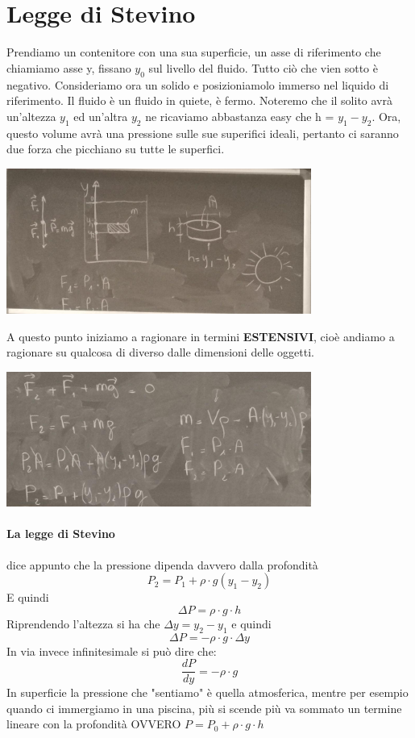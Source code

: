 \documentclass[12pt, a4paper, openany, oneside]{book}
\begin{document}
\section{Legge di Stevino}
Prendiamo un contenitore con una sua superficie, un asse di riferimento che
chiamiamo asse y, fissano $y_{0}$ sul livello del fluido. Tutto ciò che vien 
sotto è negativo. 
Consideriamo ora un solido e posizioniamolo immerso nel liquido di riferimento.
Il fluido è un fluido in quiete, è fermo. Noteremo che il solito avrà un'altezza
$y_{1} $ ed un'altra $y_{2} $ ne ricaviamo abbastanza easy che h = $y_{1} - y_{2}$.
Ora, questo volume avrà una pressione sulle sue superifici ideali, pertanto ci 
saranno due forza che picchiano su tutte le superfici.
\begin{center}
\includegraphics[width=0.75\textwidth]{5}
\end{center}
A questo punto iniziamo a ragionare in termini \textbf{ESTENSIVI}, cioè andiamo
a ragionare su qualcosa di diverso dalle dimensioni delle oggetti. 
\begin{center}
\includegraphics[width=0.75\textwidth]{6}
\end{center}
\paragraph{La legge di Stevino} dice appunto che la pressione dipenda davvero 
dalla profondità 
\[
	P_{2} = P_{1} + \rho \cdot g(y_{1} - y_{2})
\]
E quindi 
\[
	\Delta P = \rho \cdot g \cdot h 
\]
Riprendendo l'altezza si ha che $\Delta y = y_{2} - y_{1}$ e quindi
\[
	\Delta P = -\rho \cdot g \cdot \Delta y
\]
In via invece infinitesimale si può dire che:
\[
	\frac{dP}{dy} = -\rho \cdot g
\]
In superficie la pressione che "sentiamo" è quella atmosferica, mentre per 
esempio quando ci immergiamo in una piscina, più si scende più va sommato un 
termine lineare con la profondità OVVERO $P = P_{0} + \rho \cdot g \cdot h$
\end{document}
